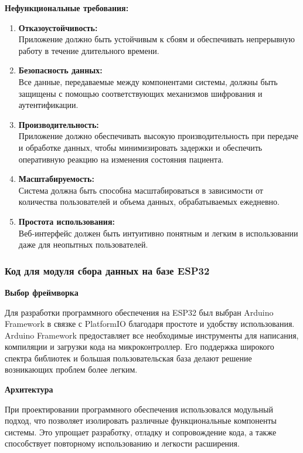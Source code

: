 \documentclass[12pt, russian]{extarticle}
\begin{document}
\begin{spacing}{1.5}
\noindent
\textbf{Нефункциональные требования:}

\begin{enumerate}
    \item \textbf{Отказоустойчивость:} \\
        Приложение должно быть устойчивым к сбоям и обеспечивать непрерывную работу в течение длительного времени.
    \item \textbf{Безопасность данных:} \\
        Все данные, передаваемые между компонентами системы, должны быть защищены с помощью соответствующих механизмов шифрования и аутентификации.
    \item \textbf{Производительность:} \\
        Приложение должно обеспечивать высокую производительность при передаче и обработке данных, чтобы минимизировать задержки и обеспечить оперативную реакцию на изменения состояния пациента.
    \item \textbf{Масштабируемость:} \\
        Система должна быть способна масштабироваться в зависимости от количества пользователей и объема данных, обрабатываемых ежедневно.
    \item \textbf{Простота использования:} \\
        Веб-интерфейс должен быть интуитивно понятным и легким в использовании даже для неопытных пользователей.
\end{enumerate}

\subsubsection{Код для модуля сбора данных на базе ESP32}

\par \noindent \textbf{Выбор фреймворка}

Для разработки программного обеспечения на ESP32 был выбран Arduino Framework в связке с PlatformIO благодаря простоте и удобству использования. Arduino Framework предоставляет все необходимые инструменты для написания, компиляции и загрузки кода на микроконтроллер. Его поддержка широкого спектра библиотек и большая пользовательская база делают решение возникающих проблем более легким.

\par \noindent \textbf{Архитектура}

При проектировании программного обеспечения использовался модульный подход, что позволяет изолировать различные функциональные компоненты системы. Это упрощает разработку, отладку и сопровождение кода, а также способствует повторному использованию и легкости расширения.


\end{spacing}
\end{document}
